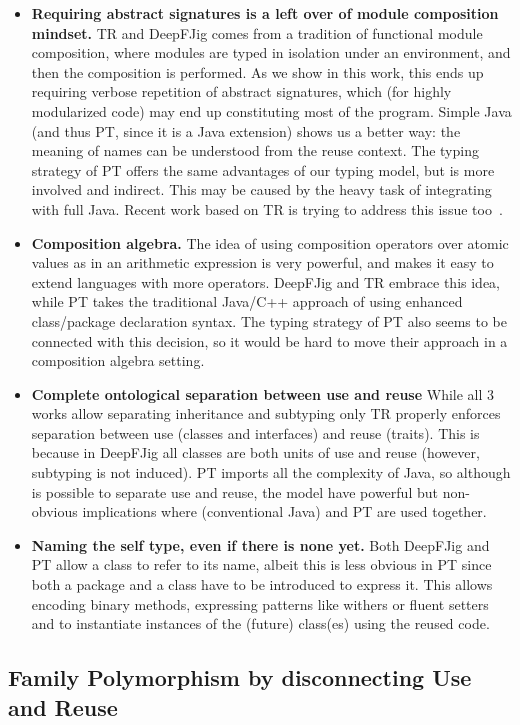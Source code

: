 \begin{itemize}
\item 
{\bf Requiring abstract signatures is a left over of module composition mindset.}
TR and DeepFJig comes from a tradition of functional module composition, where 
modules are typed in isolation under an environment, and then the composition is performed.
As we show in this work, this ends up requiring verbose repetition of abstract signatures,
which (for highly modularized code) may end up constituting most of the program.
Simple Java (and thus PT, since it is a Java extension) shows us a better way:
the meaning of names can be understood from the reuse context.
The typing strategy of PT offers the same advantages of our typing model, 
but is more involved and indirect. This may be caused by the
heavy task of integrating with full Java.
Recent work based on TR is trying to address this issue too~\cite{damiani2017unified}.
\item {\bf Composition algebra.}
The idea of using composition operators over atomic values as in an arithmetic expression is very powerful,
and makes it easy to extend languages with more operators. DeepFJig and TR embrace this idea, while PT takes the traditional Java/C++ approach of using enhanced class/package declaration syntax.
The typing strategy of PT also seems to be connected with this
decision, so it would be hard to move their approach in a composition
algebra setting.
\item {\bf Complete ontological separation between use and reuse}
While all 3 works allow separating inheritance and subtyping only TR properly enforces 
separation between use (classes and interfaces) and reuse (traits).
This is because in DeepFJig all classes are both units of use and reuse (however, subtyping is not induced).
PT imports all the complexity of Java, so although is possible to separate use and reuse, the model have powerful but non-obvious implications where (conventional Java) \Q@extends@ and PT are used together.
\item {\bf Naming the self type, even if there is none yet.}
Both DeepFJig and PT allow a class to refer to its name, albeit this is
less obvious in PT since both a package and a class have to be introduced to express it.
This allows encoding binary methods, expressing patterns like withers or fluent setters and to instantiate instances of the (future) class(es)  using the reused code.
\end{itemize}

\subsection{Family
Polymorphism by disconnecting Use and Reuse}

